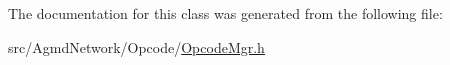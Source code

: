 The documentation for this class was generated from the following file\+:\begin{DoxyCompactItemize}
\item 
src/\+Agmd\+Network/\+Opcode/\hyperlink{_opcode_mgr_8h}{Opcode\+Mgr.\+h}\end{DoxyCompactItemize}
